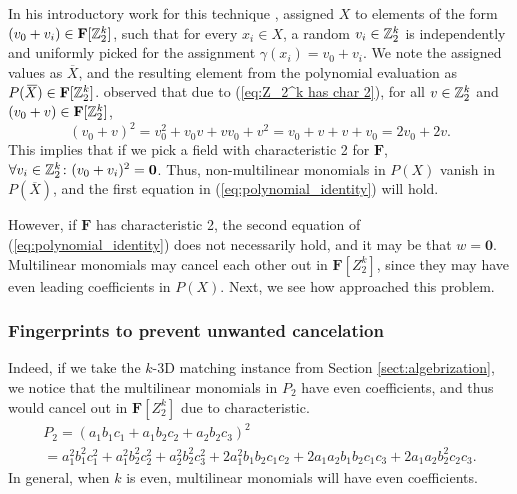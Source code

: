 In his introductory work for this technique \cite{Koutis08}, 
\citeauthor{Koutis08} assigned $X$ 
to elements of the form $(v_0 + v_i) \in \mathbf{F}[\mathbb Z_2^k]$, 
such that for every $x_i \in X$, a random $v_i \in \mathbb Z_2^k$ is independently and uniformly 
picked for the assignment 
$\gamma(x_i) = v_0 + v_i$. %
We note the assigned values as $\overbar{X}$, and the resulting element  
from the polynomial evaluation 
as $P(\,\overline{\!{X}}) \in \mathbf{F}[\mathbb Z_2^k]$. 
\citeauthor{Koutis08} observed that 
due to (\ref{eq:Z_2^k has char 2}), for all $v \in \mathbb Z_2^k$ and $(v_0 + v) \in \mathbf{F}[\mathbb Z_2^k]$, 
\[
  (v_0 + v)^2 = v_0^2 + v_0v + vv_0 + v^2 = v_0 + v + v + v_0 = 2v_0 + 2v.
\]
This implies that if we pick a field with characteristic 2 for $\mathbf{F}$, 
$\forall v_i \in \mathbb Z_2^k \colon (v_0 + v_i)^2 = \mathbf{0}$. Thus, 
non-multilinear monomials in $P(X)$ vanish in $P(\overbar{X})$, and the 
first equation in (\ref{eq:polynomial_identity}) 
will hold.

However, if $\mathbf{F}$ has characteristic 2, the second equation of (\ref{eq:polynomial_identity}) 
does not necessarily hold, and it may be that $w = \mathbf{0}$. Multilinear monomials may 
cancel each other out in $\mathbf{F}[Z_2^k]$, since they may have even leading 
coefficients in $P(X)$. Next, we see how \citeauthor{Koutis08} approached this problem.

\subsubsection{Fingerprints to prevent unwanted cancelation}
\label{sect:fingerprints}

Indeed, if we take the $k$-3D matching instance from Section \ref{sect:algebrization}, 
we notice that the multilinear monomials in $P_2$ have even coefficients, and thus 
would cancel out in $\mathbf{F}[Z_2^k]$ due to characteristic.
\begin{multline*}
  P_2 = (a_1b_1c_1 + a_1b_2c_2 + a_2b_2c_3)^2  \\
  = a_1^2b_1^2c_1^2 + a_1^2b_2^2c_2^2 + a_2^2b_2^2c_3^2 + %
  2a_1^2b_1b_2c_1c_2 + 2a_1a_2b_1b_2c_1c_3 + 2 a_1a_2b_2^2c_2c_3. 
\end{multline*}
In general, when $k$ is even, multilinear monomials will have even coefficients. 

